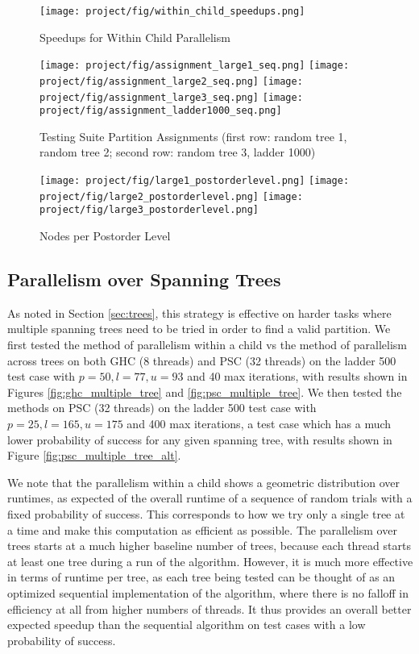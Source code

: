 \documentclass[11pt]{article}
\begin{document}
\begin{figure}
    \centering
    \texttt{[image: project/fig/within\_child\_speedups.png]}
    \caption{Speedups for Within Child Parallelism}
    \label{fig:within_child_speedup}
\end{figure}

\begin{figure}
    \centering
    \texttt{[image: project/fig/assignment\_large1\_seq.png]}
    \texttt{[image: project/fig/assignment\_large2\_seq.png]}
    \texttt{[image: project/fig/assignment\_large3\_seq.png]}
    \texttt{[image: project/fig/assignment\_ladder1000\_seq.png]}
    \caption{Testing Suite Partition Assignments (first row: random tree 1, random tree 2; second row: random tree 3, ladder 1000)}
    \label{fig:assignment}
\end{figure}

\begin{figure}
    \centering
    \texttt{[image: project/fig/large1\_postorderlevel.png]}
    \texttt{[image: project/fig/large2\_postorderlevel.png]}
    \texttt{[image: project/fig/large3\_postorderlevel.png]}
    \caption{Nodes per Postorder Level}
    \label{fig:nodes_per_level}
\end{figure}

\subsection{Parallelism over Spanning Trees}

As noted in Section \ref{sec:trees}, this strategy is effective on harder tasks where multiple spanning trees need to be tried in order to find a valid partition.
We first tested the method of parallelism within a child vs the method of parallelism across trees on both GHC (8 threads) and PSC (32 threads) on the ladder 500 test case with $p = 50, l=77, u=93$ and 40 max iterations, with results shown in Figures \ref{fig:ghc_multiple_tree} and \ref{fig:psc_multiple_tree}.
We then tested the methods on PSC (32 threads) on the ladder 500 test case with $p = 25, l = 165, u = 175$ and 400 max iterations, a test case which has a much lower probability of success for any given spanning tree, with results shown in Figure \ref{fig:psc_multiple_tree_alt}.

We note that the parallelism within a child shows a geometric distribution over runtimes, as expected of the overall runtime of a sequence of random trials with a fixed probability of success.
This corresponds to how we try only a single tree at a time and make this computation as efficient as possible.
The parallelism over trees starts at a much higher baseline number of trees, because each thread starts at least one tree during a run of the algorithm.
However, it is much more effective in terms of runtime per tree, as each tree being tested can be thought of as an optimized sequential implementation of the algorithm, where there is no falloff in efficiency at all from higher numbers of threads.
It thus provides an overall better expected speedup than the sequential algorithm on test cases with a low probability of success.
\end{document}
